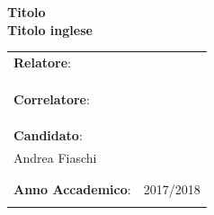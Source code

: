 \begin{titlepage}
\begin{center}
\begin{minipage}{\textwidth}
\begin{minipage}{0.4\textwidth}
\begin{flushright}
      \end{flushright}
    \end{minipage}
  \end{minipage}
  \vspace*{1.5cm}
  \vfill
  \begin{minipage}{0.7\textwidth}
  \begin{flushleft}
      {\large {\bf Titolo}} \\
      \vspace*{0.2cm}
    \vspace*{1cm}
    {\large {\bf Titolo inglese}} \\
    \vspace*{0.2cm}
   \vspace*{0.2cm}
    \vspace*{2cm}
    \begin{tabular}{l l}
      {\large \bf{Relatore}}: & {\large {\bf }}\\
      {\large  } & {\large {\bf }}\\
      \\
      \\
      {\large \bf{Correlatore}}: & {\large{\bf }}\\
      {\large } & {\large {\bf }}\\
      \\
      \\
      {\large \bf{Candidato}}: & {\large{\bf }}\\
      {\large Andrea Fiaschi} & {\large {\bf }}\\
\\
\\
{\large \bf{Anno Accademico}}: & {\large 2017/2018{\bf }}\\
      {\large } & {\large {\bf }}\\
    \end{tabular}
    \vfill
  \end{flushleft} 
 

\end{minipage}
\end{center}
\end{titlepage}
